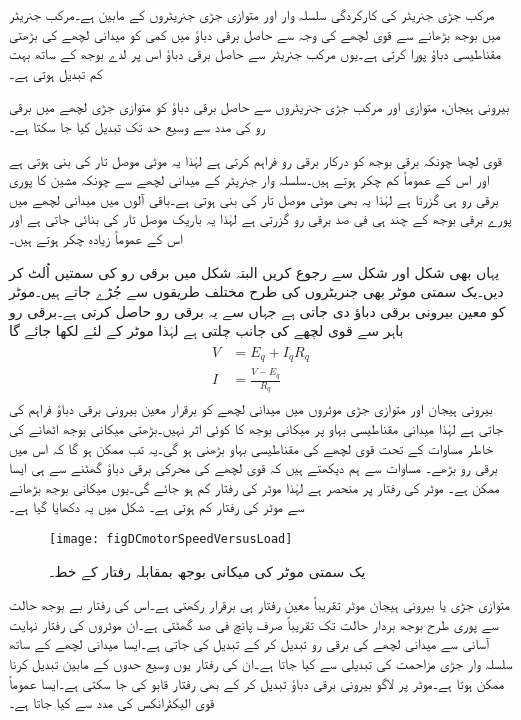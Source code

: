 مرکب جڑی جنریٹر کی کارکردگی سلسلہ وار اور متوازی جڑی جنریٹروں کے مابین ہے۔مرکب جنریٹر میں بوجھ بڑھانے سے قوی لچھے کی وجہ سے حاصل برقی دباؤ میں کمی کو میدانی لچھے کی بڑھتی مقناطیسی دباؤ پورا کرتی ہے۔یوں مرکب جنریٹر سے حاصل برقی دباؤ اس پر لدے بوجھ کے ساتھ بہت کم تبدیل ہوتی ہے۔

بیرونی ہیجان، متوازی اور مرکب جڑی جنریٹروں سے حاصل برقی دباؤ کو متوازی جڑی لچھے میں برقی رو کی مدد سے وسیع حد تک تبدیل کیا جا سکتا ہے۔

قوی لچھا چونکہ برقی بوجھ کو درکار برقی رو فراہم کرتی ہے لہٰذا یہ موٹی موصل تار کی بنی ہوتی ہے اور اس کے عموماً کم چکر ہوتے ہیں۔سلسلہ وار جنریٹر کے میدانی لچھے سے چونکہ مشین کا پوری برقی رو ہی گزرتا ہے لہٰذا یہ بھی موٹی موصل تار کی بنی ہوتی ہے۔باقی آلوں میں میدانی لچھے میں پورے برقی بوجھ کے چند ہی فی صد برقی رو گزرتی ہے لہٰذا یہ باریک موصل تار کی بنائی جاتی ہے اور اس کے عموماً زیادہ چکر ہوتے ہیں۔

یہاں بھی شکل   اور شکل   سے رجوع کریں البتہ شکل میں برقی رو کی سمتیں اُلٹ کر دیں۔یک سمتی موٹر بھی جنریٹروں کی طرح مختلف طریقوں سے جُڑے جاتے ہیں۔موٹر کو معین بیرونی برقی دباؤ دی جاتی ہے جہاں سے یہ برقی رو حاصل کرتی ہے۔برقی رو باہر سے قوی لچھے کی جانب چلتی ہے لہٰذا موٹر کے لئے لکھا جائے گا
\begin{gather}
\begin{aligned}\label{مساوات_یکسمتی_دباؤ_رو_قوی_سلسلہ_وار}
V&=E_q+I_q R_q\\
I&=\frac{V-E_q}{R_q}
\end{aligned}
\end{gather}
بیرونی ہیجان اور متوازی جڑی موٹروں میں میدانی لچھے کو برقرار معین بیرونی برقی دباؤ فراہم کی جاتی ہے لہٰذا میدانی مقناطیسی بہاو پر میکانی بوجھ کا کوئی اثر نہیں۔بڑھتی میکانی بوجھ اٹھانے کی خاطر مساوات    کے تحت قوی لچھے کی مقناطیسی بہاو بڑھنی ہو گی۔یہ تب ممکن ہو گا کہ اس میں برقی رو بڑھے۔ مساوات  سے ہم دیکھتے ہیں کہ قوی لچھے کی محرکی برقی دباؤ   گھٹنے سے ہی ایسا ممکن ہے۔ موٹر کی رفتار پر منحصر ہے لہٰذا موٹر کی رفتار کم ہو جائے گی۔یوں میکانی بوجھ بڑھانے سے موٹر کی رفتار کم ہوتی ہے۔ شکل    میں یہ دکھایا گیا ہے۔
\begin{figure}
\centering
\texttt{[image: figDCmotorSpeedVersusLoad]}
\caption{یک سمتی موٹر کی میکانی بوجھ بمقابلہ رفتار کے خط۔}
\label{شکل_یکسمتی_موٹر_رفتار_بالمقابل_بار}
\end{figure}

متوازی جڑی یا بیرونی ہیجان موٹر تقریباً معین رفتار ہی برقرار رکھتی ہے۔اس کی رفتار بے بوجھ حالت سے پوری طرح بوجھ بردار حالت تک تقریباً صرف پانچ فی صد گھٹتی ہے۔ان موٹروں کی رفتار نہایت آسانی سے میدانی لچھے کی برقی رو تبدیل کر کے تبدیل کی جاتی ہے۔ایسا میدانی لچھے کے ساتھ سلسلہ وار جڑی مزاحمت کی تبدیلی سے کیا جاتا ہے۔ان کی رفتار یوں وسیع حدوں کے مابین تبدیل کرنا ممکن ہوتا ہے۔موٹر پر لاگو بیرونی برقی دباؤ تبدیل کر کے بھی رفتار قابو کی جا سکتی ہے۔ایسا عموماً قوی الیکٹرانکس کی مدد سے کیا جاتا ہے۔

